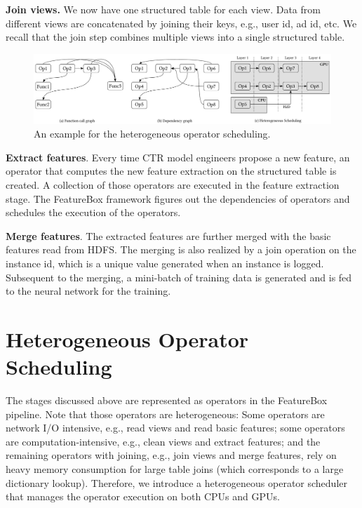 \documentclass[conference]{IEEEtran}
\begin{document}
\textbf{Join views.} 
We now have one structured table for each view. 
Data from different views are concatenated by joining their keys, e.g., user id, ad id, etc. 
We recall that the join step combines multiple views into a single structured table.

\begin{figure}[htp]
\includegraphics[width=\textwidth]{figs/dag}
\caption{An example for the heterogeneous operator scheduling.}
\label{fig:dag}\vspace{-0.05in}
\end{figure}

\textbf{Extract features}.
Every time CTR model engineers propose a new feature, an operator that computes the new feature extraction on the structured table is created. 
A collection of those operators are executed in the feature extraction stage. 
The FeatureBox framework figures out the dependencies of operators and schedules the execution of the operators.



\textbf{Merge features}. 
The extracted features are further merged with the basic features read from HDFS. The merging is also realized by a join operation on the instance id, which is a unique value generated when an instance is logged. 
Subsequent to the merging, a mini-batch of training data is generated and is fed to the neural network for the training.



\section{Heterogeneous Operator Scheduling}
The stages discussed above are represented as operators in the FeatureBox pipeline. Note that those operators are heterogeneous: Some operators are network I/O intensive, e.g., read views and read basic features; some operators are computation-intensive, e.g., clean views and extract features; and the remaining operators with joining, e.g., join views and merge features, rely on heavy memory consumption for large table joins (which corresponds to a large dictionary lookup). Therefore, we introduce a heterogeneous operator scheduler that manages the operator execution on both CPUs and GPUs. 
\end{document}
